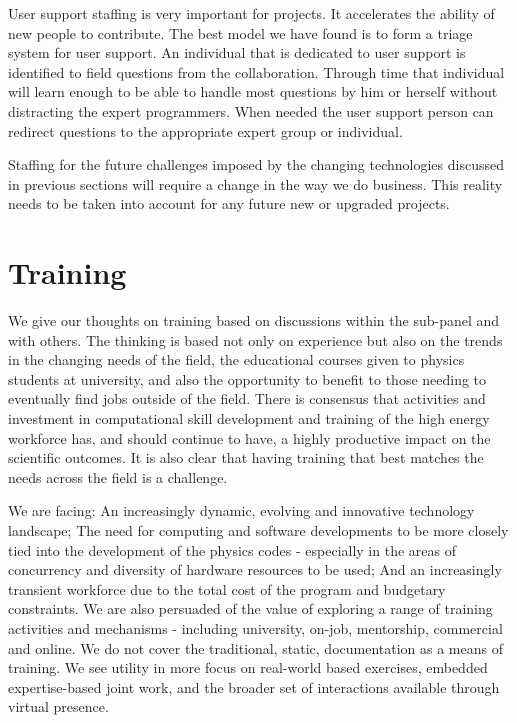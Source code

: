 User support staffing is very important for projects.  It
accelerates the ability of new people to contribute.  The best model
we have found is to form a triage system for user support.  An
individual that is dedicated to user support is identified to field
questions from the collaboration.  Through time that individual
will learn enough to be able to handle most questions by him or
herself without distracting the expert programmers.  When needed
the user support person can redirect questions to the appropriate
expert group or individual.

Staffing for the future challenges imposed by the changing technologies
discussed in previous sections will require a change in the way we
do business.  This reality needs to be taken into account for any
future new or upgraded projects.


\section{Training}
\label{CpFI4:sec:training}

We give our thoughts on training  based on  discussions within the
sub-panel and with others. The thinking is based not only on
experience but also on the trends in the changing needs of the
field, the educational courses given to  physics students at
university, and also the opportunity to benefit to those needing
to eventually find jobs outside of the field. There is consensus
that activities and investment in computational skill development
and training of the high energy workforce has, and should continue
to have, a highly productive impact on the scientific outcomes. It
is also clear that having training that best matches the needs
across the field is a challenge.

We are facing: An increasingly dynamic, evolving and innovative
technology landscape; The need for  computing and software developments
to be more closely tied into the development of the physics codes
-  especially in the areas of concurrency and diversity of hardware
resources to be used;  And an increasingly transient workforce due
to the total cost of the program and  budgetary constraints.   We
are also persuaded of the value of exploring a range of training
activities and mechanisms - including university, on-job, mentorship,
commercial and online. We do not cover the traditional, static,
documentation as a means of training. We see utility in more focus
on real-world based exercises, embedded expertise-based joint work,
and the broader set of interactions available through virtual
presence.


